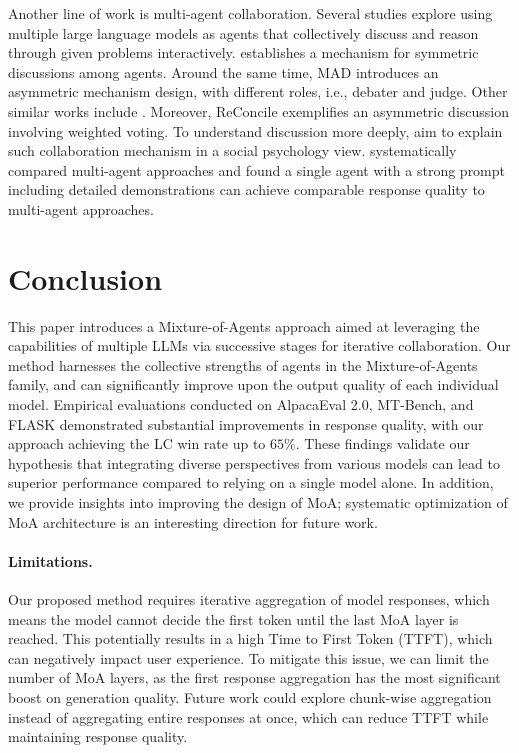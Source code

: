 \documentclass{article}
\begin{document}
Another line of work is multi-agent collaboration.
Several studies explore using multiple large language models as agents that collectively discuss and reason through given problems interactively.
\citet{debate} establishes a mechanism for symmetric discussions among agents. 
Around the same time, MAD \citep{mad} introduces an asymmetric mechanism design, with different roles, i.e., debater and judge. Other similar works include \citep{chan2023chateval}. 
Moreover, ReConcile \citep{reconcile} exemplifies an asymmetric discussion involving weighted voting. 
To understand discussion more deeply, \citet{expd} aim to explain such collaboration mechanism in a social psychology view. 
\citet{wang2024rethinking} systematically compared multi-agent approaches and found a single agent with a strong prompt including detailed demonstrations can achieve comparable response quality to multi-agent approaches. 


\section{Conclusion}
\label{section:limitation}
\label{section:broad}

This paper introduces a Mixture-of-Agents approach aimed at leveraging the capabilities of multiple LLMs via successive stages for iterative collaboration. Our method harnesses the collective strengths of agents in the Mixture-of-Agents family, and can significantly improve upon the output quality of each individual model.
Empirical evaluations conducted on AlpacaEval 2.0, MT-Bench, and FLASK demonstrated substantial improvements in response quality, with our approach achieving the LC win rate up to $65\%$. 
These findings validate our hypothesis that integrating diverse perspectives from various models can lead to superior performance compared to relying on a single model alone. In addition, we provide insights into improving the design of MoA; systematic optimization of MoA architecture is an interesting direction for future work. 


\paragraph{Limitations.}
Our proposed method requires iterative aggregation of model responses, 
which means the model cannot decide the first token until the last MoA layer is reached. 
This potentially results in a high Time to First Token (TTFT), which can negatively impact user experience. 
To mitigate this issue, we can limit the number of MoA layers, 
as the first response aggregation has the most significant boost on generation quality.
Future work could explore chunk-wise aggregation instead of aggregating entire responses at once, which can reduce TTFT while maintaining response quality.
\end{document}
